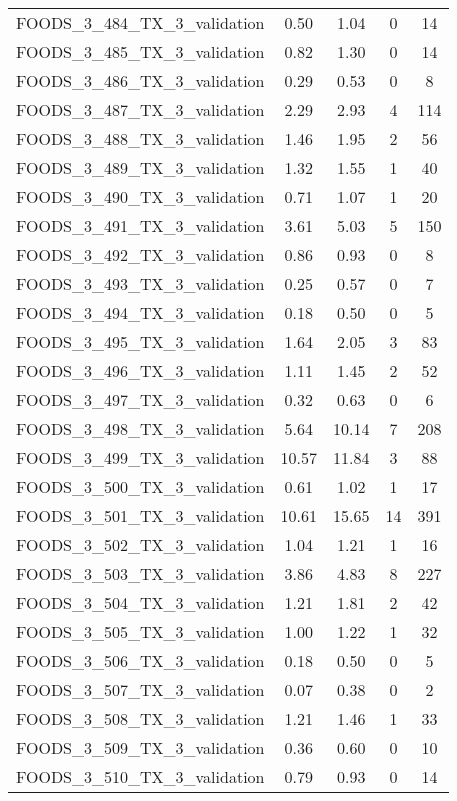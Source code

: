 \begin{table}
\begin{tabular}{|l|c|c|c|c|}
FOODS\_3\_484\_TX\_3\_validation & 0.50 & 1.04 & 0 & 14 \\
FOODS\_3\_485\_TX\_3\_validation & 0.82 & 1.30 & 0 & 14 \\
FOODS\_3\_486\_TX\_3\_validation & 0.29 & 0.53 & 0 & 8 \\
FOODS\_3\_487\_TX\_3\_validation & 2.29 & 2.93 & 4 & 114 \\
FOODS\_3\_488\_TX\_3\_validation & 1.46 & 1.95 & 2 & 56 \\
FOODS\_3\_489\_TX\_3\_validation & 1.32 & 1.55 & 1 & 40 \\
FOODS\_3\_490\_TX\_3\_validation & 0.71 & 1.07 & 1 & 20 \\
FOODS\_3\_491\_TX\_3\_validation & 3.61 & 5.03 & 5 & 150 \\
FOODS\_3\_492\_TX\_3\_validation & 0.86 & 0.93 & 0 & 8 \\
FOODS\_3\_493\_TX\_3\_validation & 0.25 & 0.57 & 0 & 7 \\
FOODS\_3\_494\_TX\_3\_validation & 0.18 & 0.50 & 0 & 5 \\
FOODS\_3\_495\_TX\_3\_validation & 1.64 & 2.05 & 3 & 83 \\
FOODS\_3\_496\_TX\_3\_validation & 1.11 & 1.45 & 2 & 52 \\
FOODS\_3\_497\_TX\_3\_validation & 0.32 & 0.63 & 0 & 6 \\
FOODS\_3\_498\_TX\_3\_validation & 5.64 & 10.14 & 7 & 208 \\
FOODS\_3\_499\_TX\_3\_validation & 10.57 & 11.84 & 3 & 88 \\
FOODS\_3\_500\_TX\_3\_validation & 0.61 & 1.02 & 1 & 17 \\
FOODS\_3\_501\_TX\_3\_validation & 10.61 & 15.65 & 14 & 391 \\
FOODS\_3\_502\_TX\_3\_validation & 1.04 & 1.21 & 1 & 16 \\
FOODS\_3\_503\_TX\_3\_validation & 3.86 & 4.83 & 8 & 227 \\
FOODS\_3\_504\_TX\_3\_validation & 1.21 & 1.81 & 2 & 42 \\
FOODS\_3\_505\_TX\_3\_validation & 1.00 & 1.22 & 1 & 32 \\
FOODS\_3\_506\_TX\_3\_validation & 0.18 & 0.50 & 0 & 5 \\
FOODS\_3\_507\_TX\_3\_validation & 0.07 & 0.38 & 0 & 2 \\
FOODS\_3\_508\_TX\_3\_validation & 1.21 & 1.46 & 1 & 33 \\
FOODS\_3\_509\_TX\_3\_validation & 0.36 & 0.60 & 0 & 10 \\
FOODS\_3\_510\_TX\_3\_validation & 0.79 & 0.93 & 0 & 14 \\

\end{tabular}
\end{table}
